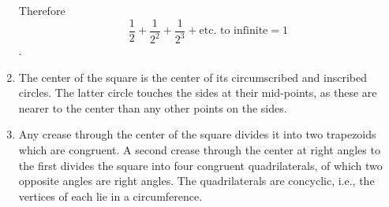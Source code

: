 \begin{enumerate}
        Therefore $$\frac{1}{2} + \frac{1}{2^2} + \frac{1}{2^3} + \text{etc.\ to
        infinite} = 1$$.


    \item The center of the square is the center of its circumscribed and
        inscribed circles. The latter circle touches the sides at their
        mid-points, as these are nearer to the center than any other points on
        the sides.

    \item Any crease through the center of the square divides it into two
        trapezoids which are congruent. A second crease through the center at
        right angles to the first divides the square into four congruent
        quadrilaterals, of which two opposite angles are right angles.  The
        quadrilaterals are concyclic, i.e., the vertices of each lie in a
        circumference.

\end{enumerate}

